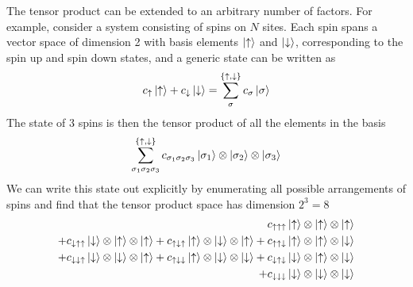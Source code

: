 \documentclass[../Main/chem532-notes.tex]{subfiles}
\begin{document}
The tensor product can be extended to an arbitrary number of factors. For example, consider a system consisting of spins on $N$ sites.
Each spin spans a vector space of dimension 2 with basis elements $\ket{\uparrow}$ and $\ket{\downarrow}$, corresponding to the spin up and spin down states, and a generic state can be written as
\begin{equation}
c_{\uparrow} \ket{\uparrow} + c_{\downarrow} \ket{\downarrow} = \sum_{\sigma}^{\{\uparrow, \downarrow \} } c_\sigma \ket{\sigma}
\end{equation}
The state of 3 spins is then the tensor product of all the elements in the basis 
\begin{equation}
\sum_{\sigma_1 \sigma_2 \sigma_3}^{\{\uparrow, \downarrow \} } c_{\sigma_1 \sigma_2 \sigma_3} \ket{\sigma_1} \otimes \ket{\sigma_2} \otimes \ket{\sigma_3}
\end{equation}
We can write this state out explicitly by enumerating all possible arrangements of spins and find that the tensor product space has dimension $2^3 = 8$
\begin{equation}
\begin{split}
   c_{\uparrow\uparrow\uparrow}  \ket{\uparrow} \otimes \ket{\uparrow} \otimes \ket{\uparrow} \\
+ c_{\downarrow\uparrow\uparrow}  \ket{\downarrow} \otimes \ket{\uparrow} \otimes \ket{\uparrow}
+ c_{\uparrow\downarrow\uparrow}   \ket{\uparrow} \otimes \ket{\downarrow} \otimes \ket{\uparrow}
+ c_{\uparrow\uparrow\downarrow}   \ket{\uparrow} \otimes \ket{\uparrow} \otimes \ket{\downarrow} \\
+ c_{\downarrow\downarrow\uparrow}  \ket{\downarrow} \otimes \ket{\downarrow} \otimes \ket{\uparrow}
+ c_{\uparrow\downarrow\downarrow}   \ket{\uparrow} \otimes \ket{\downarrow} \otimes \ket{\downarrow}
+ c_{\downarrow\uparrow\downarrow}   \ket{\downarrow} \otimes \ket{\uparrow} \otimes \ket{\downarrow} \\
+ c_{\downarrow\downarrow\downarrow}   \ket{\downarrow} \otimes \ket{\downarrow} \otimes \ket{\downarrow}
\end{split}
\end{equation}
\end{document}
